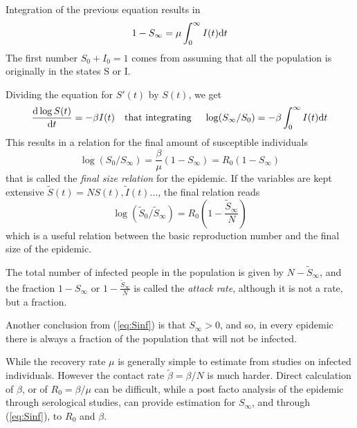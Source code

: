 Integration of the previous equation results in
\[ 1 - S_\infty  = \mu \int_0^\infty I(t)\mathrm{d} t
\]
The first number $S_0+I_0 = 1$ comes from assuming that all the population is originally in the states S or I.

Dividing the equation for $S'(t)$ by $S(t)$, we get
\[ \frac{ \mathrm{d} \log S(t)}{\mathrm{d} t}  =  -\beta I(t) \quad \mbox{that integrating }\quad  \log(S_\infty / S_0) = -\beta \int_0^\infty I(t)\mathrm{d} t\] This results in a relation for the final amount of susceptible individuals
\[\log(S_0 / S_\infty)  = \frac \beta \mu (1-S_\infty) = R_0 (1-S_\infty) \]
that is called the {\it final size relation} for the epidemic. If the variables are kept extensive $\tilde S(t) = N S(t), \tilde I(t) \ldots $, the final relation reads
\begin{equation}
 \log(\tilde S_0 / \tilde S_\infty)  =  R_0 (1-\frac {\tilde S_\infty} N) \label{eq:Sinf} 
\end{equation}
which is a useful relation between the basic reproduction number and the final size of the epidemic. 

The total number of infected people in the population is given by $N-\tilde S_\infty$, and the fraction $1-S_\infty$ or $1-\frac {\tilde S_\infty }N$ is called the {\it attack rate}, although it is not a rate, but a fraction.

Another conclusion from (\ref{eq:Sinf}) is that $S_\infty>0$, and so, in every epidemic there is always a fraction of the population that will not be infected.

While the recovery rate $\mu$ is generally simple to estimate from studies on infected individuals. However the contact rate $\tilde \beta = \beta/N$ is much harder. Direct calculation of $\beta$, or of $R_0 =\beta/\mu$ can be difficult, while a post facto analysis of the epidemic through serological studies, can provide estimation for $S_\infty$, and through (\ref{eq:Sinf}), to $R_0$ and $\beta$.

